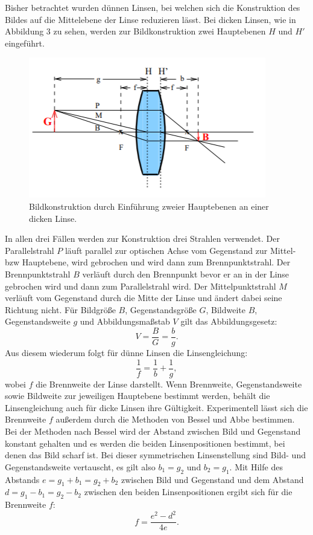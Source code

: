 \noindent Bisher betrachtet wurden dünnen Linsen, bei welchen sich die Konstruktion
des Bildes auf die Mittelebene der Linse reduzieren lässt. Bei dicken
Linsen, wie in Abbildung 3 zu sehen, werden zur Bildkonstruktion zwei
Hauptebenen $H$ und $H'$ eingeführt.

\begin{figure}[H]
\label{fig:dicke}
\center
\includegraphics[scale=0.75]{dick.png}
\caption{Bildkonstruktion durch Einführung zweier Hauptebenen an einer dicken Linse.\cite[S.1]{kent}}
\end{figure}

\noindent In allen drei Fällen werden zur Konstruktion drei Strahlen verwendet. Der
Parallelstrahl $P$  läuft parallel zur optischen Achse vom Gegenstand zur
Mittel- bzw Hauptebene, wird gebrochen und wird dann zum Brennpunktstrahl.
Der Brennpunktstrahl $B$ verläuft durch den Brennpunkt bevor er an in der
Linse gebrochen wird und dann zum Parallelstrahl wird. Der Mittelpunktstrahl
$M$ verläuft vom Gegenstand durch die Mitte der Linse und ändert dabei
seine Richtung nicht.
\noindent Für Bildgröße $B$, Gegenstandsgröße $G$, Bildweite $B$, Gegenstandsweite
$g$ und Abbildungsmaßstab $V$ gilt das Abbildungsgesetz:
\begin{equation}
\label{eqn:abbildungsgesetz}
V = \frac{B}{G} = \frac{b}{g}.
\end{equation}
Aus diesem wiederum folgt für dünne Linsen die Linsengleichung:
\begin{equation}
\label{eqn:linsengleichung}
\frac{1}{f} = \frac{1}{b} + \frac{1}{g},
\end{equation}
wobei $f$ die Brennweite der Linse darstellt.
Wenn Brennweite, Gegenstandsweite sowie Bildweite zur jeweiligen Hauptebene bestimmt werden, behält die Linsengleichung auch für dicke
Linsen ihre Gültigkeit.
\noindent Experimentell lässt sich die Brennweite $f$ außerdem durch die Methoden
von Bessel und Abbe bestimmen.
Bei der Methoden nach Bessel wird der Abstand zwischen Bild und Gegenstand
konstant gehalten und es werden die beiden Linsenpositionen bestimmt, bei
denen das Bild scharf ist. Bei dieser symmetrischen Linsenstellung sind
Bild- und Gegenstandsweite vertauscht, es gilt also $b_1 = g_2$ und
$b_2 = g_1$. Mit Hilfe des Abstands $e = g_1 + b_1 = g_2 + b_2$ zwischen
Bild und Gegenstand und dem Abstand $d = g_1 - b_1 = g_2 -b_2$ zwischen
den beiden Linsenpositionen ergibt sich für die Brennweite $f$:
\begin{equation}
\label{eq:bessel}
f = \frac{e^2 - d^2}{4e}.
\end{equation}

